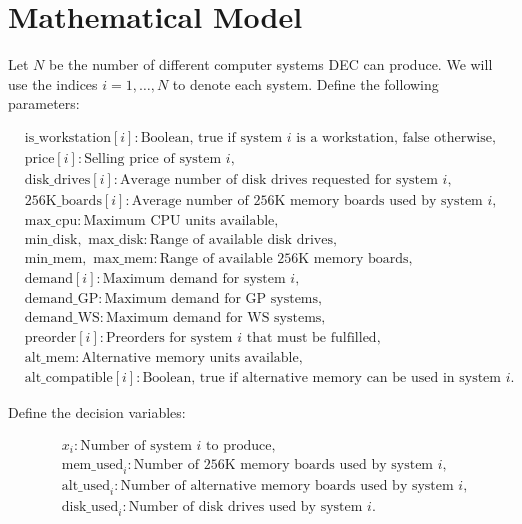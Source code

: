 \documentclass{article}
\begin{document}
\section*{Mathematical Model}

Let \( N \) be the number of different computer systems DEC can produce. We will use the indices \( i = 1, \ldots, N \) to denote each system. Define the following parameters:

\begin{align*}
    & \text{is\_workstation}[i] : \text{Boolean, true if system } i \text{ is a workstation, false otherwise},\\
    & \text{price}[i] : \text{Selling price of system } i, \\
    & \text{disk\_drives}[i] : \text{Average number of disk drives requested for system } i, \\
    & \text{256K\_boards}[i] : \text{Average number of 256K memory boards used by system } i, \\
    & \text{max\_cpu} : \text{Maximum CPU units available}, \\
    & \text{min\_disk}, \text{ max\_disk} : \text{Range of available disk drives}, \\
    & \text{min\_mem}, \text{ max\_mem} : \text{Range of available 256K memory boards}, \\
    & \text{demand}[i] : \text{Maximum demand for system } i, \\
    & \text{demand\_GP} : \text{Maximum demand for GP systems}, \\
    & \text{demand\_WS} : \text{Maximum demand for WS systems}, \\
    & \text{preorder}[i] : \text{Preorders for system } i \text{ that must be fulfilled}, \\
    & \text{alt\_mem} : \text{Alternative memory units available}, \\
    & \text{alt\_compatible}[i] : \text{Boolean, true if alternative memory can be used in system } i.
\end{align*}

Define the decision variables:

\begin{align*}
    & x_i : \text{Number of system } i \text{ to produce}, \\
    & \text{mem\_used}_i : \text{Number of 256K memory boards used by system } i, \\
    & \text{alt\_used}_i : \text{Number of alternative memory boards used by system } i, \\
    & \text{disk\_used}_i : \text{Number of disk drives used by system } i.
\end{align*}
\end{document}

